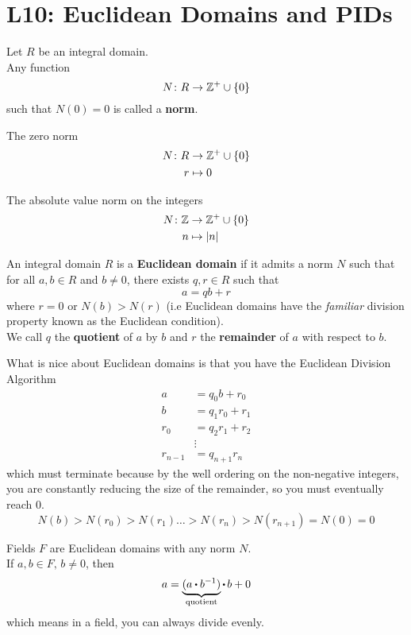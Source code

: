 \documentclass[../Main.tex]{subfiles}
\begin{document}
\chapter{L10: Euclidean Domains and PIDs}
\begin{dfn}[title = Norm,label=norm]
	Let $R$ be an integral domain.\\
	Any function
	\[N\colon R\to \mathbb{Z}^+\cup \{0\}\]
	such that $N(0)=0$ is called a \textbf{norm}.
\end{dfn}
\begin{example}
	The zero norm
	\begin{align*}
		N\colon R&\to \mathbb{Z}^+\cup \{0\} \\
		r&\mapsto 0
	\end{align*}
\end{example}
\begin{example}
	The absolute value norm on the integers
	\begin{align*}
	N\colon \mathbb{Z}&\to \mathbb{Z}^+\cup \{0\} \\
	n&\mapsto |n|
	\end{align*}
\end{example}
\begin{dfn}[title = {Euclidean Domain, Quotient, Remainder}]
	An integral domain $R$ is a \textbf{Euclidean domain} if it admits a norm $N$ such that for all $a,b\in R$ and $b\ne 0$, there exists $q,r\in R$ such that
	\[a=qb+r\]
	where $r=0$ or $N(b)>N(r)$ (i.e Euclidean domains have the \textit{familiar} division property known as the Euclidean condition).\\
	We call $q$ the \textbf{quotient} of $a$ by $b$ and $r$ the \textbf{remainder} of $a$ with respect to $b$.
\end{dfn}
What is nice about Euclidean domains is that you have the Euclidean Division Algorithm
\begin{align*}
a&=q_0b+r_0\\
b&=q_1r_0+r_1\\
r_0&=q_2r_1+r_2\\
&\vdots\\
r_{n-1}&=q_{n+1}r_n
\end{align*}
which must terminate because by the well ordering on the non-negative integers, you are constantly reducing the size of the remainder, so you must eventually reach $0$.
\[N(b)>N(r_0)>N(r_1)\dots >N(r_n)> N(r_{n+1})=N(0)=0 \]
\newpage
\begin{example}
	Fields $F$ are Euclidean domains with any norm $N$.\\
	If $a,b\in F, \, b\ne0$, then
	\[a=\underbrace{(a\rdot b^{-1})}_{\text{quotient}}\rdot\, b+ 0 \]
	which means in a field, you can always divide evenly.
\end{example}
\end{document}
